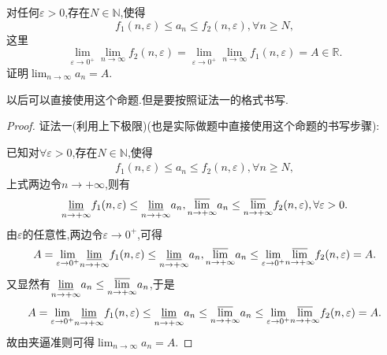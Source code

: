 \documentclass[lang=cn,newtx,10pt,scheme=chinese]{elegantbook}
\begin{document}
\begin{proposition}
对任何\(\varepsilon > 0\),存在\(N \in \mathbb{N}\),使得
\[
f_1(n,\varepsilon) \leq a_n \leq f_2(n,\varepsilon), \forall n \geq N,
\]
这里
\[
\lim_{\varepsilon \to 0^+} \lim_{n \to \infty} f_2(n,\varepsilon) = \lim_{\varepsilon \to 0^+} \lim_{n \to \infty} f_1(n,\varepsilon) = A \in \mathbb{R}.
\]
证明\(\lim_{n \to \infty} a_n = A\).
\end{proposition}
\begin{note}
   以后可以直接使用这个命题.但是要按照证法一的格式书写.
\end{note}
\begin{proof}
   {\color{blue}证法一(利用上下极限)(也是实际做题中直接使用这个命题的书写步骤):}

   已知对$\forall \varepsilon>0$,存在$N\in \mathbb{N}$,使得
   \begin{align*}
      f_1(n,\varepsilon) \leq a_n \leq f_2(n,\varepsilon), \forall n \geq N,
   \end{align*}
   上式两边令$n\to+\infty$,则有
   \begin{align*}
      \underset{n\rightarrow +\infty}{{\varliminf }}f_1(n,\varepsilon )\le \underset{n\rightarrow +\infty}{{\varliminf }}a_n,\underset{n\rightarrow +\infty}{{\varlimsup }}a_n\le \underset{n\rightarrow +\infty}{{\varlimsup }}f_2(n,\varepsilon ),\forall \varepsilon >0.
   \end{align*}
   由$\varepsilon$的任意性,两边令$\varepsilon\to 0^+$,可得
   \begin{align*}
      A=\underset{\varepsilon \rightarrow 0^+}{\lim}\underset{n\rightarrow +\infty}{{\varliminf }}f_1(n,\varepsilon )\le \underset{n\rightarrow +\infty}{{\varliminf }}a_n,\underset{n\rightarrow +\infty}{{\varlimsup }}a_n\le \underset{\varepsilon \rightarrow 0^+}{\lim}\underset{n\rightarrow +\infty}{{\varlimsup }}f_2(n,\varepsilon )=A.
   \end{align*}
   又显然有$\underset{n\rightarrow +\infty}{{\varliminf }}a_n\le \underset{n\rightarrow +\infty}{{\varlimsup }}a_n$,于是
   \begin{align*}
      A=\underset{\varepsilon \rightarrow 0^+}{\lim}\underset{n\rightarrow +\infty}{{\varliminf }}f_1(n,\varepsilon )\le \underset{n\rightarrow +\infty}{{\varliminf }}a_n\le \underset{n\rightarrow +\infty}{{\varlimsup }}a_n\le \underset{\varepsilon \rightarrow 0^+}{\lim}\underset{n\rightarrow +\infty}{{\varlimsup }}f_2(n,\varepsilon )=A.
   \end{align*}
   故由夹逼准则可得$\lim_{n \to \infty} a_n = A$.


\end{proof}
\end{document}
